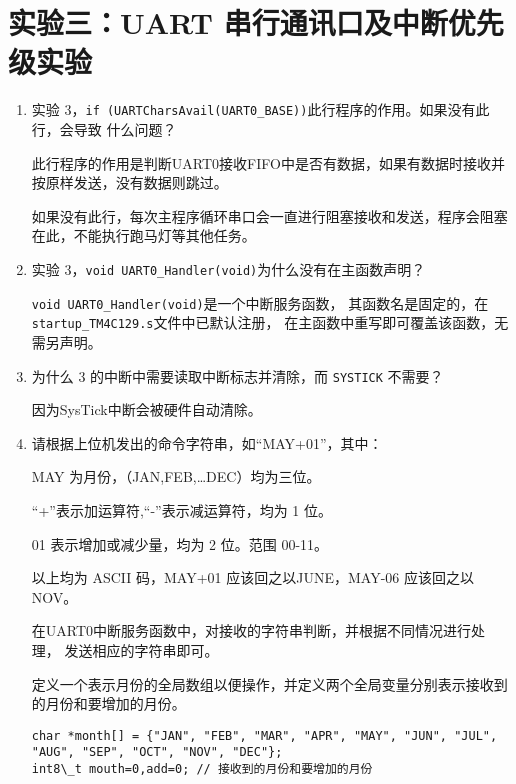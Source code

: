 \documentclass[12pt, a4paper, oneside]{ctexart}
\begin{document}
    \section{实验三：UART 串行通讯口及中断优先级实验}

    \begin{enumerate}[listparindent=2em]
        \item 实验 3，\verb|if (UARTCharsAvail(UART0_BASE))|此行程序的作用。如果没有此行，会导致
        什么问题？

        {\kaishu 此行程序的作用是判断UART0接收FIFO中是否有数据，如果有数据时接收并按原样发送，没有数据则跳过。
        
        如果没有此行，每次主程序循环串口会一直进行阻塞接收和发送，程序会阻塞在此，不能执行跑马灯等其他任务。}

        \item 实验 3，\verb|void UART0_Handler(void)|为什么没有在主函数声明？
        
        {\kaishu \verb|void UART0_Handler(void)|是一个中断服务函数，
        其函数名是固定的，在\verb|startup_TM4C129.s|文件中已默认注册，
        在主函数中重写即可覆盖该函数，无需另声明。}
        
        \item 为什么 3 的中断中需要读取中断标志并清除，而 \verb|SYSTICK| 不需要？
        
        {\kaishu 因为SysTick中断会被硬件自动清除。}

        \item 请根据上位机发出的命令字符串，如“MAY+01”，其中：
        
        MAY 为月份，（JAN,FEB,…DEC）均为三位。

        “+”表示加运算符,“-”表示减运算符，均为 1 位。

        01 表示增加或减少量，均为 2 位。范围 00-11。

        以上均为 ASCII 码，MAY+01 应该回之以JUNE，MAY-06 应该回之以 NOV。

        {\kaishu 在UART0中断服务函数中，对接收的字符串判断，并根据不同情况进行处理，
        发送相应的字符串即可。
        
        定义一个表示月份的全局数组以便操作，并定义两个全局变量分别表示接收到的月份和要增加的月份。}
        
    \begin{lstlisting}     
char *month[] = {"JAN", "FEB", "MAR", "APR", "MAY", "JUN", "JUL", "AUG", "SEP", "OCT", "NOV", "DEC"};  
int8\_t mouth=0,add=0; // 接收到的月份和要增加的月份
    \end{lstlisting}


\end{enumerate}
\end{document}
